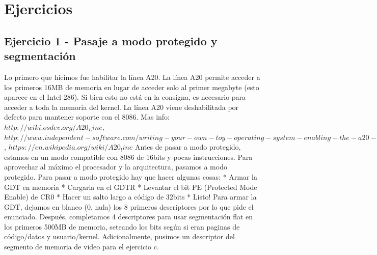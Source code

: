 \documentclass[10pt,a4paper,spanish]{article}
\begin{document}


\maketitle

\newpage


\clearpage

\section{Ejercicios}

\subsection{Ejercicio 1 - Pasaje a modo protegido y segmentación}
Lo primero que hicimos fue habilitar la línea A20. La línea A20 permite acceder a los primeros 16MB de memoria en lugar de acceder solo al primer megabyte (esto aparece en el Intel 286). Si bien esto no está en la consigna, es necesario para acceder a toda la memoria del kernel. La línea A20 viene deshabilitada por defecto para mantener soporte con el 8086.  Mas info: $http://wiki.osdev.org/A20_Line$, $http://www.independent-software.com/writing-your-own-toy-operating-system-enabling-the-a20-line/$, $https://en.wikipedia.org/wiki/A20_line$
Antes de pasar a modo protegido, estamos en un modo compatible con 8086 de 16bits y pocas instrucciones. Para aprovechar al máximo el procesador y la arquitectura, pasamos a modo protegido.
Para pasar a modo protegido hay que hacer algunas cosas:
* Armar la GDT en memoria
* Cargarla en el GDTR
* Levantar el bit PE (Protected Mode Enable) de CR0
* Hacer un salto largo a código de 32bits
* Listo!
Para armar la GDT, dejamos en blanco (0, nula) los 8 primeros descriptores por lo que pide el enunciado. Después, completamos 4 descriptores para usar segmentación flat en los primeros 500MB de memoria, seteando los bits según si eran paginas de código/datos y usuario/kernel. Adicionalmente, pusimos un descriptor del segmento de memoria de video para el ejercicio c.
\end{document}
